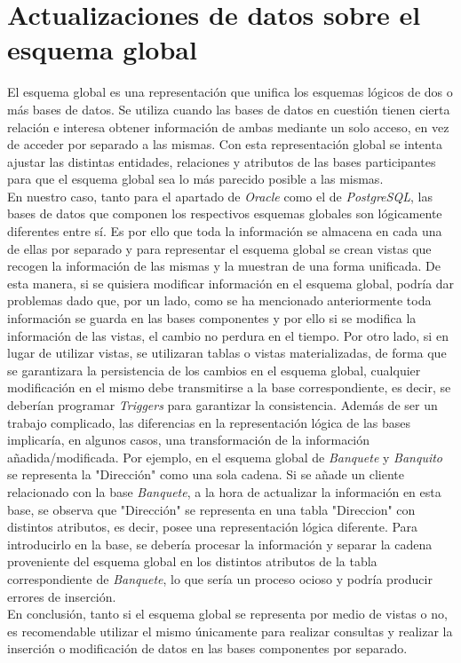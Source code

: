\documentclass{article}
\begin{document}
\section{Actualizaciones de datos sobre el esquema global}
El esquema global es una representación que unifica los esquemas lógicos de dos o más bases de datos. Se utiliza cuando las bases de datos en cuestión tienen cierta relación e interesa obtener información de ambas mediante un solo acceso, en vez de acceder por separado a las mismas. Con esta representación global se intenta ajustar las distintas entidades, relaciones y atributos de las bases participantes para que el esquema global sea lo más parecido posible a las mismas.\\ 
En nuestro caso, tanto para el apartado de \textit{Oracle} como el de \textit{PostgreSQL}, las bases de datos que componen los respectivos esquemas globales son lógicamente diferentes entre sí. Es por ello que toda la información se almacena en cada una de ellas por separado y para representar el esquema global se crean vistas que recogen la información de las mismas y la  muestran de una forma unificada. De esta manera, si se quisiera modificar información en el esquema global, podría dar problemas dado que, por un lado, como se ha mencionado anteriormente toda información se guarda en las bases componentes y por ello si se modifica la información de las vistas, el cambio no perdura en el tiempo. Por otro lado, si en lugar de utilizar vistas, se utilizaran tablas o vistas materializadas, de forma que se garantizara la persistencia de los cambios en el esquema global, cualquier modificación en el mismo debe transmitirse a la base correspondiente, es decir, se deberían programar \textit{Triggers} para garantizar la consistencia. Además de ser un trabajo complicado, las diferencias en la representación lógica de las bases implicaría, en algunos casos, una transformación de la información añadida/modificada. Por ejemplo, en el esquema global de \textit{Banquete} y \textit{Banquito} se representa la "Dirección" como una sola cadena. Si se añade un cliente relacionado con la base \textit{Banquete}, a la hora de actualizar la información en esta base, se observa que "Dirección" se representa en una tabla "Direccion" con distintos atributos, es decir, posee una representación lógica diferente. Para introducirlo en la base, se debería procesar la información y separar la cadena proveniente del esquema global en los distintos atributos de la tabla correspondiente de \textit{Banquete}, lo que sería un proceso ocioso y podría producir errores de inserción.\\
En conclusión, tanto si el esquema global se representa por medio de vistas o no, es recomendable utilizar el mismo únicamente para realizar consultas y realizar la inserción o modificación de datos en las bases componentes por separado.
\newpage
\end{document}
